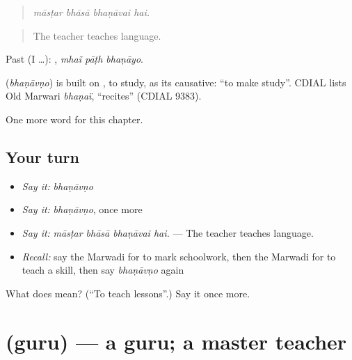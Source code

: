 \begin{quote}
   
\end{quote}

\begin{quote}
\emph{māsṭar bhāsā bhaṇāvai hai.}
\end{quote}

\begin{quote}
The teacher teaches language.
\end{quote}

Past (I …):   , \emph{mhaĩ pāṭh bhaṇāyo}.

\begin{cousinweb}
\textbf{} (\emph{bhaṇāvṇo}) is built on \textbf{}, to study, as its causative: \textquotedblleft{}to make study\textquotedblright{}. CDIAL lists Old Marwari \emph{bhaṇaï}, \textquotedblleft{}recites\textquotedblright{} (CDIAL 9383).
\end{cousinweb}

\begin{grammarlens}[title={What you've built}]
One more word for this chapter.
\end{grammarlens}

\subsection*{Your turn}
\begin{itemize}
\raggedright
  \item \emph{Say it:} \emph{bhaṇāvṇo}
  \item \emph{Say it:} \emph{bhaṇāvṇo}, once more
  \item \emph{Say it:} \emph{māsṭar bhāsā bhaṇāvai hai.} — The teacher teaches language.
  \item \emph{Recall:} say the Marwadi for to mark schoolwork, then the Marwadi for to teach a skill, then say \emph{bhaṇāvṇo} again
\end{itemize}

\begin{tcolorbox}[breakable,colback=teal!4,colframe=teal!35!black,title={Before you move on}]
What does  mean? (\textquotedblleft{}To teach lessons\textquotedblright{}.) Say it once more.
\end{tcolorbox}
\section[\texorpdfstring{\mw{गुरु} (guru)}{गुरु (guru)}]{ (guru) — a guru; a master teacher}

